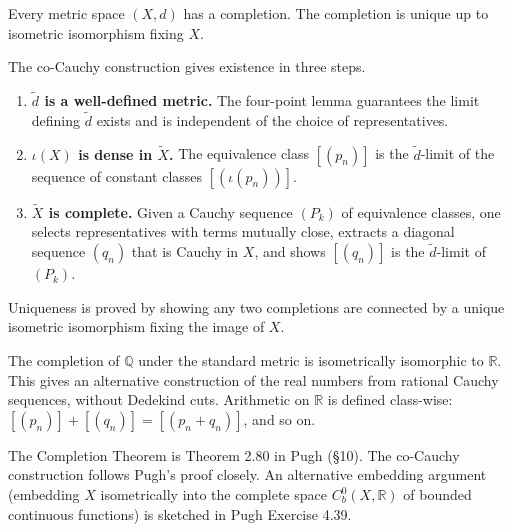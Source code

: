 \begin{tcolorbox}[colback=thmbox, colframe=thmborder, arc=2pt,
  left=6pt, right=6pt, top=4pt, bottom=4pt,
  title={\small\textbf{Theorem (Completion Theorem)}},
  fonttitle=\small\bfseries]
\begin{theorem}
\label{thm:completion}
Every metric space $(X,d)$ has a completion.
The completion is unique up to isometric isomorphism fixing $X$.
\end{theorem}
\end{tcolorbox}

\begin{remark*}
The co-Cauchy construction gives existence in three steps.
\begin{enumerate}[label=(\roman*), leftmargin=2em]
  \item \textbf{$\widetilde{d}$ is a well-defined metric.}
        The four-point lemma guarantees the limit defining $\widetilde{d}$
        exists and is independent of the choice of representatives.
  \item \textbf{$\iota(X)$ is dense in $\widetilde{X}$.}
        The equivalence class $[(p_n)]$ is the $\widetilde{d}$-limit of
        the sequence of constant classes $[(\iota(p_n))]$.
  \item \textbf{$\widetilde{X}$ is complete.}
        Given a Cauchy sequence $(P_k)$ of equivalence classes, one
        selects representatives with terms mutually close, extracts a
        diagonal sequence $(q_n)$ that is Cauchy in $X$, and shows
        $[(q_n)]$ is the $\widetilde{d}$-limit of $(P_k)$.
\end{enumerate}
Uniqueness is proved by showing any two completions are connected by a
unique isometric isomorphism fixing the image of $X$.
\end{remark*}

\begin{remark*}
The completion of $\mathbb{Q}$ under the standard metric is isometrically
isomorphic to $\mathbb{R}$.
This gives an alternative construction of the real numbers from rational
Cauchy sequences, without Dedekind cuts.
Arithmetic on $\mathbb{R}$ is defined class-wise:
$[(p_n)] + [(q_n)] = [(p_n + q_n)]$, and so on.
\end{remark*}

\begin{remark*}
The Completion Theorem is Theorem 2.80 in Pugh (\S10).
The co-Cauchy construction follows Pugh's proof closely.
An alternative embedding argument (embedding $X$ isometrically into the
complete space $C^0_b(X,\mathbb{R})$ of bounded continuous functions)
is sketched in Pugh Exercise 4.39.
\end{remark*}

